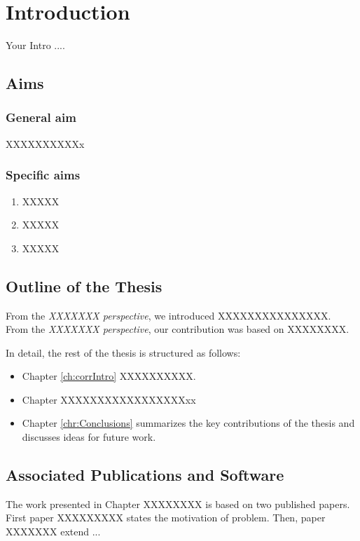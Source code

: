 
\inbpdocument

\chapter{Introduction}
\label{chr:IntroT}
Your Intro ....


\section{Aims}
\subsection{General aim}

XXXXXXXXXXx
\subsection{Specific aims}

\begin{itemize}
	\begin{enumerate}
	\item XXXXX
	\item XXXXX
	\item XXXXX
\end{enumerate}
\end{itemize}

\section{Outline of the Thesis}

From the \textit{XXXXXXX perspective}, we introduced XXXXXXXXXXXXXXX. \\

From the \textit{XXXXXXX perspective}, our contribution was based on XXXXXXXX.

In detail, the rest of the thesis is structured as follows:

\begin{itemize}
	\item Chapter \ref{ch:corrIntro} XXXXXXXXXX.
	
	\item Chapter XXXXXXXXXXXXXXXXXxx
	
	\item Chapter \ref{chr:Conclusions} summarizes the key contributions of the thesis and discusses ideas for future work.
\end{itemize}

\section{Associated Publications and Software}

The work presented in Chapter XXXXXXXX is based on two published papers. First paper XXXXXXXXX states the motivation of problem. Then, paper XXXXXXX extend ...








\outbpdocument{}
